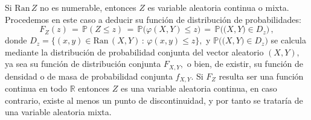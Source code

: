 \documentclass[spanish,10pt,letterpaper]{article}
\newcommand{\prob}{\mathbb{P}}
\newcommand{\Runo}{\mathbb{R}}
\begin{document}
\medskip 

Si $\text{Ran}\,Z$ no es numerable, entonces $Z$ es variable aleatoria continua o mixta. Procedemos en este caso a deducir su función de distribución de probabilidades:
\begin{equation}\label{eq:FZvXY}
    F_Z(z) \,=\, \prob(Z\leq z) \,=\, \prob\big(\varphi(X,Y)\leq z\big) \,=\, \prob\big(\big(X,Y)\in D_z)\,,
\end{equation}
donde $D_z=\{(x,y)\in\text{Ran}\,(X,Y)\,:\,\varphi(x,y)\leq z\},$  y $\prob\big(\big(X,Y)\in D_z)$ se calcula mediante la distribución de probabilidad conjunta del vector aleatorio $(X,Y),$ ya sea su función de distribución conjunta $F_{X,Y},$ o bien, de existir, su función de densidad o de masa de probabilidad conjunta $f_{X,Y}.$ Si $F_Z$ resulta ser una función continua en todo $\Runo$ entonces $Z$ es una variable aleatoria continua, en caso contrario, existe al menos un punto de discontinuidad, y por tanto se trataría de una variable aleatoria mixta. 

\bigskip 
\end{document}

